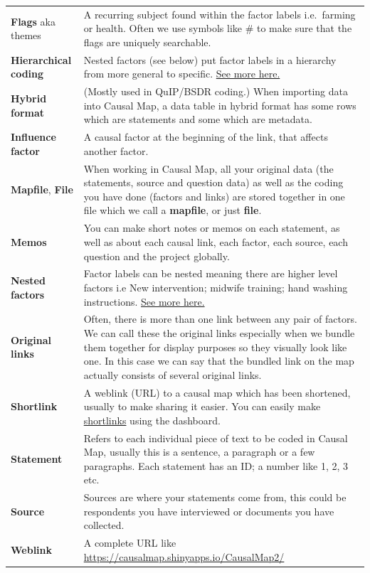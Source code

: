 \documentclass[
]{book}
\begin{document}
\begin{longtable}[]{@{}
  >{\raggedright\arraybackslash}p{}
  >{\raggedright\arraybackslash}p{}@{}}
\textbf{Flags} aka themes & A recurring subject found within the factor labels i.e.~farming or health. Often we use symbols like \# to make sure that the flags are uniquely searchable. \\
\textbf{Hierarchical coding} & Nested factors (see below) put factor labels in a hierarchy from more general to specific. \protect\hyperlink{simplifying}{See more here.} \\
\textbf{Hybrid format} & (Mostly used in QuIP/BSDR coding.) When importing data into Causal Map, a data table in hybrid format has some rows which are statements and some which are metadata. \\
\textbf{Influence factor} & A causal factor at the beginning of the link, that affects another factor. \\
\textbf{Mapfile}, \textbf{File} & When working in Causal Map, all your original data (the statements, source and question data) as well as the coding you have done (factors and links) are stored together in one file which we call a \textbf{mapfile}, or just \textbf{file}. \\
\textbf{Memos} & You can make short notes or memos on each statement, as well as about each causal link, each factor, each source, each question and the project globally. \\
\textbf{Nested factors} & Factor labels can be nested meaning there are higher level factors i.e New intervention; midwife training; hand washing instructions. \protect\hyperlink{simplifying}{See more here.} \\
\textbf{Original links} & Often, there is more than one link between any pair of factors. We can call these the original links especially when we bundle them together for display purposes so they visually look like one. In this case we can say that the bundled link on the map actually consists of several original links. \\
\textbf{Shortlink} & A weblink (URL) to a causal map which has been shortened, usually to make sharing it easier. You can easily make \protect\hyperlink{xsharing_view}{shortlinks} using the dashboard. \\
\textbf{Statement} & Refers to each individual piece of text to be coded in Causal Map, usually this is a sentence, a paragraph or a few paragraphs. Each statement has an ID; a number like 1, 2, 3 etc. \\
\textbf{Source} & Sources are where your statements come from, this could be respondents you have interviewed or documents you have collected. \\
\textbf{Weblink} & A complete URL like \url{https://causalmap.shinyapps.io/CausalMap2/} \\
\bottomrule
\end{longtable}
\end{document}
